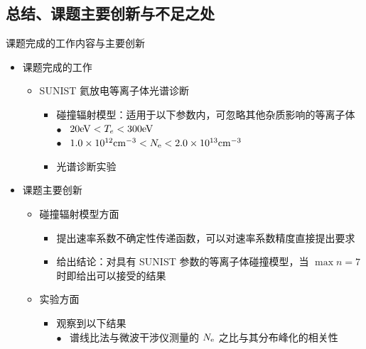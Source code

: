 \begin{CJK*}{UTF8}{kai}
\section{总结、课题主要创新与不足之处}

\begin{frame}{课题完成的工作内容与主要创新}
	\begin{itemize}
		\item 课题完成的工作
			\begin{itemize}
				\item SUNIST 氦放电等离子体光谱诊断
					\begin{itemize}
						\item 碰撞辐射模型：适用于以下参数内，可忽略其他杂质影响的等离子体\\%
								{\footnotesize
								{\color{bulletcolor}\quad\tiny{}\hbox{{$\bullet$}}}~ $20{\rm eV}<T_e<300{\rm eV}$ \\
								{\color{bulletcolor}\quad\tiny{}\hbox{{$\bullet$}}}~ $1.0\times10^{12}{\rm cm}^{-3}<N_{\rm e}<2.0\times10^{13}{\rm cm}^{-3}$
								}
						\item 光谱诊断实验%
					\end{itemize}
			\end{itemize}
		\bigskip
		\item 课题主要创新
			\begin{itemize}
				\item 碰撞辐射模型方面
					\begin{itemize}
						\item 提出速率系数不确定性传递函数，可以对速率系数精度直接提出要求
						\item 给出结论：对具有 SUNIST 参数的等离子体碰撞模型，当 $\max n=7$ 时即给出可以接受的结果
					\end{itemize}
				\item 实验方面
					\begin{itemize}
						\item 观察到以下结果\\
						{\footnotesize
							{\color{bulletcolor}\quad\tiny{}\hbox{{$\bullet$}}}~ 谱线比法与微波干涉仪测量的 $N_{\rm e}$ 之比与其分布峰化的相关性 \\
}
\end{itemize}
\end{itemize}
\end{itemize}
\end{frame}
\end{CJK*}
